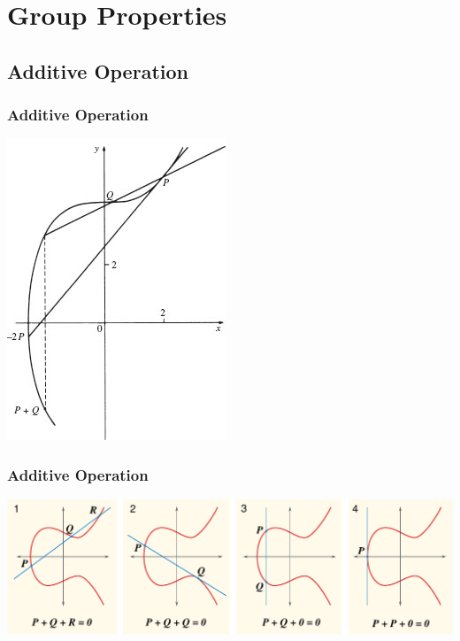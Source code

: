 \documentclass{beamer}
\begin{document}
    \section{Group Properties}
    \subsection{Additive Operation}
    \begin{frame}
        \frametitle{Additive Operation}
        \centering
        \includegraphics[height=.9\textheight]{grouplaw.jpg}
    \end{frame}

    \begin{frame}
        \frametitle{Additive Operation}
        \centering
        \includegraphics[width=\textwidth]{ECClines.pdf}
    \end{frame}
\end{document}
